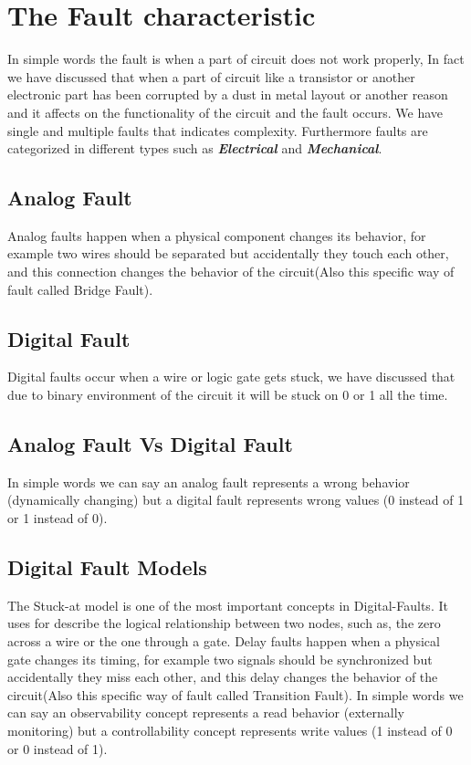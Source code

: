 \documentclass[12pt, a4paper, twocolumn]{article}
\begin{document}
\section{The Fault characteristic}
In simple words the fault is when a part of circuit does not work properly, In fact we have discussed that when a part of circuit like a transistor or another electronic part has been corrupted by a dust in metal layout or another reason and it affects on the functionality of the circuit and the fault occurs.
We have single and multiple faults that indicates complexity. Furthermore faults are categorized in different types such as \textbf{\textit{Electrical}} and \textbf{\textit{Mechanical}}.

\subsection{Analog Fault}
Analog faults happen when a physical component changes its behavior, for example two wires should be separated but accidentally they touch each other, and this connection changes the behavior of the circuit(Also this specific way of fault called Bridge Fault).

\subsection{Digital Fault}
Digital faults occur when a wire or logic gate gets stuck, we have discussed that due to binary environment of the circuit it will be stuck on 0 or 1 all the time.

\subsection{Analog Fault Vs Digital Fault}
In simple words we can say an analog fault represents a wrong behavior (dynamically changing) but a digital fault represents wrong values (0 instead of 1 or 1 instead of 0).

\subsection{Digital Fault Models}
The Stuck-at model is one of the most important concepts in Digital-Faults.
It uses for describe the logical relationship between two nodes, such as, the zero across a wire or the one through a gate.
Delay faults happen when a physical gate changes its timing, for example two signals should be synchronized but accidentally they miss each other, and this delay changes the behavior of the circuit(Also this specific way of fault called Transition Fault).
In simple words we can say an observability concept represents a read behavior (externally monitoring) but a controllability concept represents write values (1 instead of 0 or 0 instead of 1).
\end{document}
